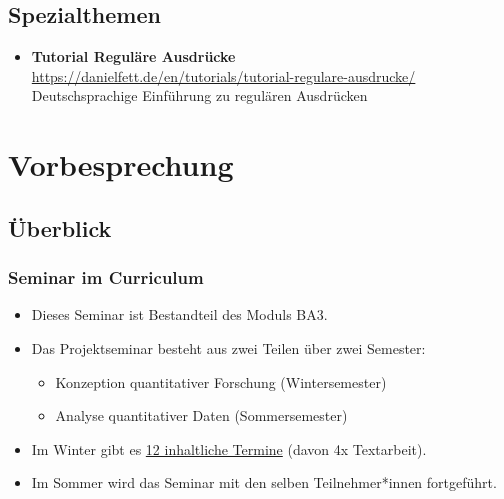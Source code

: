 \documentclass[11pt,german,a4paper]{article}
\providecommand{\tightlist}{%
  \setlength{\itemsep}{0pt}\setlength{\parskip}{0pt}}
\begin{document}
\hypertarget{spezialthemen}{%
\subsection*{Spezialthemen}\label{spezialthemen}}

\begin{itemize}
\tightlist
\item
  \textbf{Tutorial Reguläre Ausdrücke}\\
  \url{https://danielfett.de/en/tutorials/tutorial-regulare-ausdrucke/}~\\
  Deutschsprachige Einführung zu regulären Ausdrücken
\end{itemize}

\hypertarget{vorbesprechung}{%
\section{Vorbesprechung}\label{vorbesprechung}}

\hypertarget{uxfcberblick}{%
\subsection{Überblick}\label{uxfcberblick}}

\hypertarget{seminar-im-curriculum}{%
\subsubsection{Seminar im Curriculum}\label{seminar-im-curriculum}}

\begin{itemize}
\tightlist
\item
  Dieses Seminar ist Bestandteil des Moduls BA3.
\item
  Das Projektseminar besteht aus zwei Teilen über zwei Semester:

  \begin{itemize}
  \tightlist
  \item
    Konzeption quantitativer Forschung (Wintersemester)
  \item
    Analyse quantitativer Daten (Sommersemester)
  \end{itemize}
\item
  Im Winter gibt es \protect\hyperlink{terminuxfcberblick}{12 inhaltliche Termine} (davon 4x Textarbeit).
\item
  Im Sommer wird das Seminar mit den selben Teilnehmer*innen fortgeführt.
\end{itemize}
\end{document}
